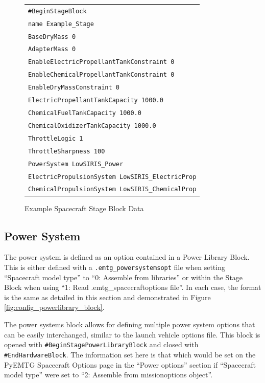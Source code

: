 \begin{figure}[H]
    \centering
    \begin{tabular}{|l|}
        \hline
        {\tt \#BeginStageBlock} \\
        {\tt name Example\_Stage} \\
        {\tt BaseDryMass 0} \\
        {\tt AdapterMass 0} \\
        {\tt EnableElectricPropellantTankConstraint 0} \\
        {\tt EnableChemicalPropellantTankConstraint 0} \\
        {\tt EnableDryMassConstraint 0} \\
        {\tt ElectricPropellantTankCapacity 1000.0} \\
        {\tt ChemicalFuelTankCapacity 1000.0} \\
        {\tt ChemicalOxidizerTankCapacity 1000.0} \\
        {\tt ThrottleLogic 1} \\
        {\tt ThrottleSharpness 100} \\
        {\tt PowerSystem LowSIRIS\_Power} \\
        {\tt ElectricPropulsionSystem LowSIRIS\_ElectricProp} \\
        {\tt ChemicalPropulsionSystem LowSIRIS\_ChemicalProp} \\
        \hline
    \end{tabular}
    \caption{Example Spacecraft Stage Block Data}
    \label{fig:config_stageblock}
\end{figure}



\subsection{Power System}
\label{sec:power_system}
The power system is defined as an option contained in a Power Library Block. This is either defined with a {\tt .emtg\_powersystemsopt} file when setting ``Spacecraft model type'' to ``0: Assemble from libraries'' or within the Stage Block when using ``1: Read .emtg\_spacecraftoptions file''. In each case, the format is the same as detailed in this section and demonstrated in Figure \ref{fig:config_powerlibrary_block}. 

The power systems block allows for defining multiple power system options that can be easily interchanged, similar to the launch vehicle options file. This block is opened with {\tt \#BeginStagePowerLibraryBlock} and closed with {\tt \#EndHardwareBlock}. The information set here is that which would be set on the PyEMTG Spacecraft Options page in the ``Power options'' section if ``Spacecraft model type'' were set to ``2: Assemble from missionoptions object''.


